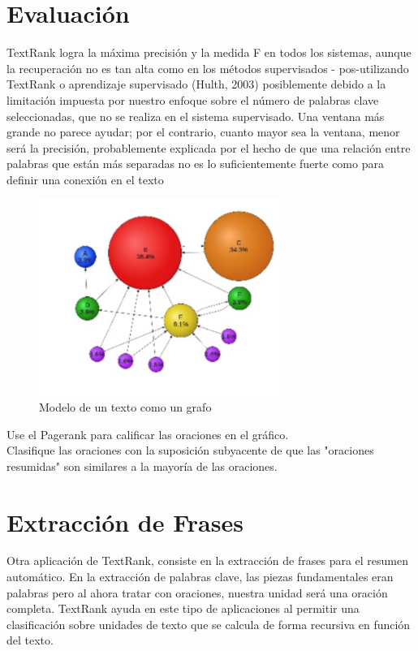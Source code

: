 \documentclass[conference]{IEEEtran}
\begin{document}
\section{Evaluación}
TextRank logra la máxima precisión y la medida F en todos los sistemas, aunque la recuperación no es tan alta como en los métodos supervisados - pos-utilizando TextRank o aprendizaje supervisado (Hulth, 2003) posiblemente debido a la limitación impuesta por nuestro enfoque sobre el número de palabras clave seleccionadas, que no se realiza en el sistema supervisado. Una ventana más grande no parece ayudar; por el contrario, cuanto mayor sea la ventana, menor será la precisión, probablemente explicada por el hecho de que una relación entre palabras que están más separadas no es lo suficientemente fuerte como para definir una conexión en el texto
\begin{figure}
  \includegraphics[width=8cm]{figure2.png}
  \caption{Modelo de un texto como un grafo}
\end{figure}
Use el Pagerank para calificar las oraciones en el gráfico. \\
Clasifique las oraciones con la suposición subyacente de que las "oraciones resumidas" son similares a la mayoría de las oraciones. \\

\section{Extracción de Frases}
Otra aplicación de TextRank, consiste en la extracción de frases para el resumen automático. En la extracción de palabras clave, las piezas fundamentales eran palabras pero al ahora tratar con oraciones, nuestra unidad será una oración completa. TextRank ayuda en este tipo de aplicaciones al permitir una clasificación sobre unidades de texto que se calcula de forma recursiva en función del texto.
\end{document}
